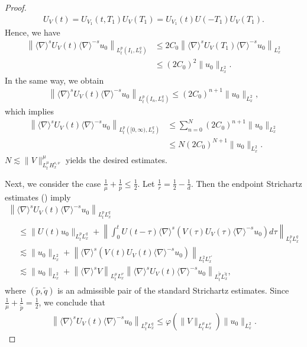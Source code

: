 \documentclass[10pt,a4paper]{amsart}
\providecommand{\No}[1]{\left\| #1 \right\|}
\newcommand{\ph}{\varphi}
\newcommand{\ta}{\tau}
\newcommand{\wt}{\widetilde}
\renewcommand{\No}[1]{\left\| #1 \right\|}
\newcommand{\I}{\infty}
\newcommand{\sd}{\langle \nabla \rangle}
\newcommand{\tw}{\frac{1}{2}}
\newcommand{\ls}{\lesssim}
\begin{document}
\begin{proof}
\begin{align}
U_V(t) = U_{V_1}(t,T_1)U_V(T_1) = U_{V_1}(t) U(-T_1) U_V(T_1).
\end{align}
Hence, we have
\begin{equation}
\begin{split}
\left\|\sd^s U_V(t) \sd^{-s} u_0\right\|_{L^p_t\left(I_1,L^q_x\right)} &\le 2C_0\left\|\sd^s U_V(T_1)\sd^{-s} u_0\right\|_{L^2_x} \\
&\le (2C_0)^2 \|u_0\|_{L^2_x}.
\end{split}
\end{equation}
In the same way, we obtain
\begin{align}
\left\|\sd^s U_V(t) \sd^{-s} u_0\right\|_{L^p_t\left(I_n,L^q_x\right)}
\le (2C_0)^{n+1} \|u_0\|_{L^2_x},
\end{align}
which implies
\begin{equation}
\begin{split}
\left\|\sd^s U_V(t) \sd^{-s} u_0\right\|_{L^p_t\left([0,\I),L^q_x\right)} &\le \sum_{n=0}^N (2C_0)^{n+1} \|u_0\|_{L^2_x}
\\
&\le N(2C_0)^{N+1} \|u_0\|_{L^2_x}.
\end{split}
\end{equation}
$N \ls \|V\|_{L^\mu_t H^{s,\nu}_x}^\mu$ yields the desired estimates.

Next, we consider the case $\frac{1}{\mu} + \frac{1}{p} \le \tw$. Let $\frac{1}{r}=\frac{1}{2}-\frac{1}{d}$. Then the endpoint Strichartz estimates (\cite{1998KT}) imply
\begin{multline}
\left\|\sd^s U_V(t)\sd^{-s} u_0\right\|_{L^p_t L^q_x}\\
\begin{aligned}
&\le \|U(t)u_0\|_{L^p_t L^q_x} + \No{ \int_0^t U(t-\ta)\sd^s \left(V(\ta)U_V(\ta) \sd^{-s}u_0\right)d\ta }_{L^p_t L^q_x} \\
&\ls \|u_0\|_{L^2_x} + \left\|\sd^s \left(V(t)U_V(t)\sd^{-s}u_0\right)\right\|_{L^2_t L^{r'}_x} \\
&\ls \|u_0\|_{L^2_x} + \left\|\sd^s V\right\|_{L^\mu_t L^\nu_x} \left\|\sd^s U_V(t)\sd^{-s} u_0 \right\|_{L^{\wt{p}}_t L^{\wt{q}}_x},
\end{aligned}
\end{multline}
where $(\wt{p}, \wt{q})$ is an admissible pair of the standard Strichartz estimates. Since $\frac{1}{\mu}+\frac{1}{\wt{p}} = \tw$, we conclude that
\begin{align}
\left\|\sd^s U_V(t)\sd^{-s} u_0\right\|_{L^p_t L^q_x}
\le \ph\left(\|V\|_{L^\mu_t L^\nu_x}\right) \|u_0\|_{L^2_x}.
\end{align}


\end{proof}
\end{document}
